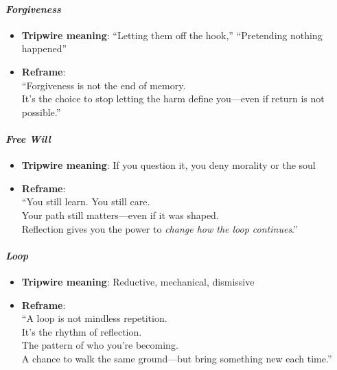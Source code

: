 \paragraph{\texorpdfstring{\textbf{\emph{Forgiveness}}}{Forgiveness}}\label{forgiveness}

\begin{itemize}
\item
  \textbf{Tripwire meaning}: ``Letting them off the hook,'' ``Pretending
  nothing happened''
\item
  \textbf{Reframe}:\\
  ``Forgiveness is not the end of memory.\\
  It's the choice to stop letting the harm define you---even if return
  is not possible.''
\end{itemize}

\paragraph{\texorpdfstring{\textbf{\emph{Free Will}}}{Free Will}}\label{free-will}

\begin{itemize}
\item
  \textbf{Tripwire meaning}: If you question it, you deny morality or
  the soul
\item
  \textbf{Reframe}:\\
  ``You still learn. You still care.\\
  Your path still matters---even if it was shaped.\\
  Reflection gives you the power to \emph{change how the loop
  continues}.''
\end{itemize}

\paragraph{\texorpdfstring{\textbf{\emph{Loop}}}{Loop}}\label{loop}

\begin{itemize}
\item
  \textbf{Tripwire meaning}: Reductive, mechanical, dismissive
\item
  \textbf{Reframe}:\\
  ``A loop is not mindless repetition.\\
  It's the rhythm of reflection.\\
  The pattern of who you're becoming.\\
  A chance to walk the same ground---but bring something new each
  time.''
\end{itemize}

